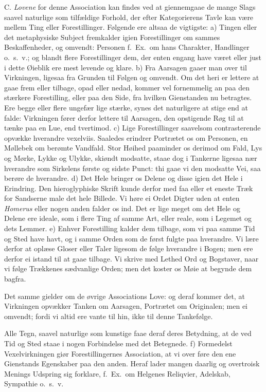 \documentclass[12pt,a4paper]{article}
\newcommand{\opage}[1]{\marginnote{\footnotesize\textit{[#1]}}}
\begin{document}
C. \emph{Lovene} for denne Association kan findes ved at giennemgaae de mange Slags saavel
naturlige som tilfældige Forhold, der efter Kategorierens Tavle kan være mellem Ting
eller Forestillinger. Følgende ere altsaa de vigtigste: a) Tingen eller det metaphysiske
Subject fremkalder igien Forestillinger om sammes Beskaffenheder, og omvendt: Personen
f.~Ex.\ om hans Charakter, Handlinger o.~s.~v.; og blandt flere Forestillinger dem, der
enten engang have været eller just i dette Øieblik ere mest levende og klare. b) Fra
Aarsagen gaaer man over til Virkningen, ligesaa fra Grunden til Følgen og omvendt. Om det
heri er lettere at gaae frem eller tilbage, opad eller nedad, kommer vel fornemmelig an
paa den stærkere Forestilling, eller paa den Side, fra hvilken Gienstanden nu betragtes.
Ere begge eller flere ungefær lige stærke, synes det naturligere at stige end at falde:
Virkningen fører derfor lettere til Aarsagen, den opstigende Røg til at tænke paa en Lue,
end tvertimod. c) Lige Forestillinger saavelsom contrasterende opvække hverandre
vexelviis. Saaledes erindrer Portrætet os om Personen, en Møllebek om berømte Vandfald.
Stor Høihed paaminder os derimod om Fald,
\opage{96} Lys og Mørke, Lykke og Ulykke, skiøndt modsatte, staae dog i Tankerne ligesaa nær
hverandre som Sirkelens første og sidste Punct: thi gaae vi den modsatte Vei, saa berøre
de hverandre. d) Det Hele bringer os Delene og disse igien det Hele i Erindring. Den
hieroglyphiske Skrift kunde derfor med faa eller et eneste Træk for Sandserne male det
hele Billede. Vi høre ei Ordet Digter uden at enten \emph{Homerus} eller nogen anden
falder os ind. Det er lige meget om det Hele og Delene ere ideale, som i flere Ting af
samme Art, eller reale, som i Legemet og dets Lemmer. e) Enhver Forestilling kalder dem
tilbage, som vi paa samme Tid og Sted have havt, og i samme Orden som de først fulgte paa
hverandre. Vi lære derfor at oplæse Gloser eller Taler ligesom de følge hverandre i
Bogen; men ere derfor ei istand til at gaae tilbage. Vi skrive med Lethed Ord og
Bogstaver, naar vi følge Trækkenes sædvanlige Orden; men det koster os Møie at begynde
dem bagfra.

Det samme gielder om de øvrige Associations Love: og deraf kommer det, at Virkningen
opvækker Tanken om Aarsagen, Portrætet om Originalen; men ei omvendt; fordi vi altid ere
vante til hin, ikke til denne Tankefølge.

Alle Tegn, saavel naturlige som kunstige faae deraf deres Betydning, at de ved Tid og
Sted staae i nogen Forbindelse med det Betegnede. f) Formedelst Vexelvirkningen giør
Forestillingernes Association, at vi over%
\opage{97}føre den ene Gienstands Egenskaber paa den anden. Heraf lader mangen daarlig og
overtroisk Menings Udspring sig forklare, f.~Ex.\ om Helgenes Reliqvier, Adelskab,
Sympathie o.~s.~v.
\end{document}
